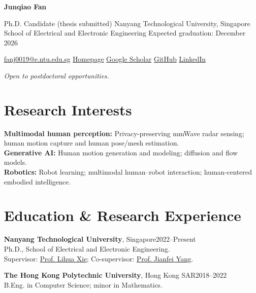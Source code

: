 \documentclass[10pt,a4paper]{article}
\begin{document}
{\fontsize{27}{30}\selectfont\bfseries Junqiao Fan}

Ph.D. Candidate (thesis submitted)\enspace\textbar\enspace
Nanyang Technological University, Singapore\\
School of Electrical and Electronic Engineering\enspace\textbar\enspace
Expected graduation: December 2026

{\small
\href{mailto:fanj0019@e.ntu.edu.sg}{fanj0019@e.ntu.edu.sg}\enspace\textbar\enspace
\href{https://fanjunqiao.github.io/junqiao-homepage/}{Homepage}\enspace\textbar\enspace
\href{https://scholar.google.com/citations?user=5cEG4tIAAAAJ&hl=en}{Google Scholar}\enspace\textbar\enspace
\href{https://github.com/FanJunqiao}{GitHub}\enspace\textbar\enspace
\href{https://sg.linkedin.com/in/junqiao-fan-234134403}{LinkedIn}}

{\small\textit{Open to postdoctoral opportunities.}}

\section*{Research Interests}
\textbf{Multimodal human perception:} Privacy-preserving mmWave radar sensing; human motion capture and human pose/mesh estimation.\\
\textbf{Generative AI:} Human motion generation and modeling; diffusion and flow models.\\
\textbf{Robotics:} Robot learning; multimodal human--robot interaction; human-centered embodied intelligence.

\section*{Education \& Research Experience}
\textbf{Nanyang Technological University}, Singapore\hfill 2022--Present\\
Ph.D., School of Electrical and Electronic Engineering.\\
Supervisor: \href{https://personal.ntu.edu.sg/elhxie/}{Prof. Lihua Xie};
Co-supervisor: \href{https://marsyang.site/}{Prof. Jianfei Yang}.

\textbf{The Hong Kong Polytechnic University}, Hong Kong SAR\hfill 2018--2022\\
B.Eng. in Computer Science; minor in Mathematics.
\end{document}
